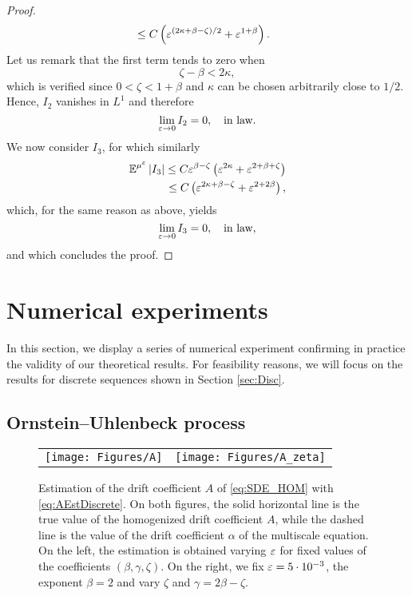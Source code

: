 \documentclass[10pt]{article}
\begin{document}
\begin{proof}
\begin{equation}
\begin{aligned}
		&\leq C \left(\varepsilon^{(2\kappa+\beta-\zeta)/2} + \varepsilon^{1+\beta}\right).
	\end{aligned}
	\end{equation}	
	Let us remark that the first term tends to zero when
	\begin{equation}
		\zeta - \beta < 2\kappa,
	\end{equation}
	which is verified since $0 < \zeta < 1 + \beta$ and $\kappa$ can be chosen arbitrarily close to $1/2$. Hence, $I_2$ vanishes in $L^1$ and therefore
	\begin{equation}
		\lim_{\varepsilon\to 0} I_2 = 0, \quad \text{in law}.
	\end{equation}
	We now consider $I_3$, for which similarly
	\begin{equation}
	\begin{aligned}
		\operatorname{\mathbb{E}}^{\mu^\varepsilon}\left\lvert I_3\right\rvert \leq C \varepsilon^{\beta - \zeta} \left(\varepsilon^{2\kappa} + \varepsilon^{2+\beta + \zeta}\right)\\
		\leq C\left(\varepsilon^{2\kappa + \beta - \zeta} + \varepsilon^{2+2\beta}\right),
	\end{aligned}	
	\end{equation}
	which, for the same reason as above, yields
	\begin{equation}
		\lim_{\varepsilon\to 0} I_3 = 0, \quad \text{in law},
	\end{equation}
	and which concludes the proof.
\end{proof}


\section{Numerical experiments}

In this section, we display a series of numerical experiment confirming in practice the validity of our theoretical results. For feasibility reasons, we will focus on the results for discrete sequences shown in Section \ref{sec:Disc}.

\subsection{Ornstein--Uhlenbeck process}

\begin{figure}[t]
	\centering
	\begin{tabular}{cc}
		\texttt{[image: Figures/A]} & \texttt{[image: Figures/A\_zeta]}
	\end{tabular}
	\caption{Estimation of the drift coefficient $A$ of \eqref{eq:SDE_HOM} with \eqref{eq:AEstDiscrete}. On both figures, the solid horizontal line is the true value of the homogenized drift coefficient $A$, while the dashed line is the value of the drift coefficient $\alpha$ of the multiscale equation. On the left, the estimation is obtained varying $\varepsilon$ for fixed values of the coefficients $(\beta, \gamma, \zeta)$. On the right, we fix $\varepsilon = 5\cdot 10^{-3}$, the exponent $\beta = 2$ and vary $\zeta$ and $\gamma = 2\beta - \zeta$.}
	\label{fig:A}
\end{figure} 
\end{document}
